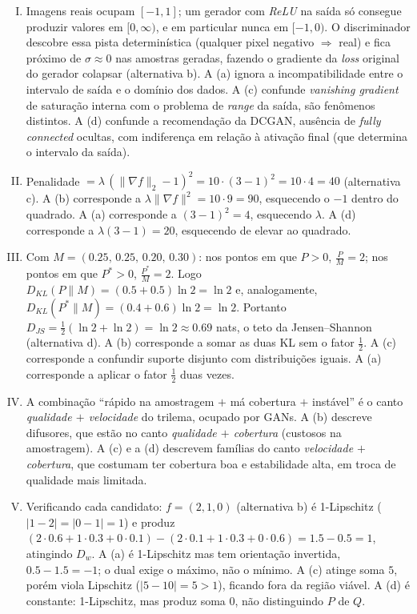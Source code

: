 \documentclass{dlproblemset}
\begin{document}
\begin{enumerate}[I)]
    \item Imagens reais ocupam $[-1, 1]$; um gerador com \emph{ReLU} na saída só consegue produzir valores em $[0, \infty)$, e em particular nunca em $[-1, 0)$. O discriminador descobre essa pista determinística (qualquer pixel negativo $\Rightarrow$ real) e fica próximo de $\sigma \approx 0$ nas amostras geradas, fazendo o gradiente da \emph{loss} original do gerador colapsar (alternativa b). A (a) ignora a incompatibilidade entre o intervalo de saída e o domínio dos dados. A (c) confunde \emph{vanishing gradient} de saturação interna com o problema de \emph{range} da saída, são fenômenos distintos. A (d) confunde a recomendação da DCGAN, ausência de \emph{fully connected} ocultas, com indiferença em relação à ativação final (que determina o intervalo da saída).

    \item Penalidade $= \lambda\,(\|\nabla f\|_{2} - 1)^{2} = 10 \cdot (3 - 1)^{2} = 10 \cdot 4 = 40$ (alternativa c). A (b) corresponde a $\lambda\|\nabla f\|^{2} = 10 \cdot 9 = 90$, esquecendo o $-1$ dentro do quadrado. A (a) corresponde a $(3 - 1)^{2} = 4$, esquecendo $\lambda$. A (d) corresponde a $\lambda(3 - 1) = 20$, esquecendo de elevar ao quadrado.

    \item Com $M = (0.25,\, 0.25,\, 0.20,\, 0.30)$: nos pontos em que $P > 0$, $\tfrac{P}{M} = 2$; nos pontos em que $P^{*} > 0$, $\tfrac{P^{*}}{M} = 2$. Logo $D_{KL}(P\|M) = (0.5 + 0.5)\ln 2 = \ln 2$ e, analogamente, $D_{KL}(P^{*}\|M) = (0.4 + 0.6)\ln 2 = \ln 2$. Portanto $D_{JS} = \tfrac{1}{2}(\ln 2 + \ln 2) = \ln 2 \approx 0.69$ nats, o teto da Jensen--Shannon (alternativa d). A (b) corresponde a somar as duas KL sem o fator $\tfrac{1}{2}$. A (c) corresponde a confundir suporte disjunto com distribuições iguais. A (a) corresponde a aplicar o fator $\tfrac{1}{2}$ duas vezes.

    \item A combinação ``rápido na amostragem $+$ má cobertura $+$ instável'' é o canto \emph{qualidade $+$ velocidade} do trilema, ocupado por GANs. A (b) descreve difusores, que estão no canto \emph{qualidade $+$ cobertura} (custosos na amostragem). A (c) e a (d) descrevem famílias do canto \emph{velocidade $+$ cobertura}, que costumam ter cobertura boa e estabilidade alta, em troca de qualidade mais limitada.

    \item Verificando cada candidato: $f = (2, 1, 0)$ (alternativa b) é 1-Lipschitz ($|1 - 2| = |0 - 1| = 1$) e produz $(2 \cdot 0.6 + 1 \cdot 0.3 + 0 \cdot 0.1) - (2 \cdot 0.1 + 1 \cdot 0.3 + 0 \cdot 0.6) = 1.5 - 0.5 = 1$, atingindo $D_{w}$. A (a) é 1-Lipschitz mas tem orientação invertida, $0.5 - 1.5 = -1$; o dual exige o máximo, não o mínimo. A (c) atinge soma $5$, porém viola Lipschitz ($|5 - 10| = 5 > 1$), ficando fora da região viável. A (d) é constante: 1-Lipschitz, mas produz soma $0$, não distinguindo $P$ de $Q$.


\end{enumerate}
\end{document}
